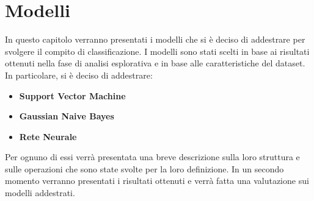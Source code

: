 \chapter{Modelli} \label{ch:modelli}
In questo capitolo verranno presentati i modelli che si è deciso di addestrare
per svolgere il compito di classificazione. I modelli sono stati scelti in base
ai risultati ottenuti nella fase di analisi esplorativa e in base alle
caratteristiche del dataset. In particolare, si è deciso di addestrare:
\begin{itemize}
    \item \textbf{Support Vector Machine}
    \item \textbf{Gaussian Naive Bayes}
    \item \textbf{Rete Neurale}
\end{itemize}
Per ognuno di essi verrà presentata una breve descrizione sulla loro struttura
e sulle operazioni che sono state svolte per la loro definizione. In un secondo
momento verranno presentati i risultati ottenuti e verrà fatta una valutazione
sui modelli addestrati.

